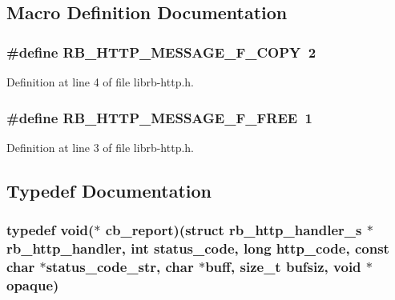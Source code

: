 \subsection{Macro Definition Documentation}
\hypertarget{librb-http_8h_a0ffdecd586e5dc8f1eeede6bac9bc19f}{
\subsubsection[{R\-B\-\_\-\-H\-T\-T\-P\-\_\-\-M\-E\-S\-S\-A\-G\-E\-\_\-\-F\-\_\-\-C\-O\-P\-Y}]{\setlength{\rightskip}{0pt plus 5cm}\#define R\-B\-\_\-\-H\-T\-T\-P\-\_\-\-M\-E\-S\-S\-A\-G\-E\-\_\-\-F\-\_\-\-C\-O\-P\-Y~2}}\label{librb-http_8h_a0ffdecd586e5dc8f1eeede6bac9bc19f}


Definition at line 4 of file librb-\/http.\-h.

\hypertarget{librb-http_8h_aef79f44f520e54cbedce1068fe324720}{
\subsubsection[{R\-B\-\_\-\-H\-T\-T\-P\-\_\-\-M\-E\-S\-S\-A\-G\-E\-\_\-\-F\-\_\-\-F\-R\-E\-E}]{\setlength{\rightskip}{0pt plus 5cm}\#define R\-B\-\_\-\-H\-T\-T\-P\-\_\-\-M\-E\-S\-S\-A\-G\-E\-\_\-\-F\-\_\-\-F\-R\-E\-E~1}}\label{librb-http_8h_aef79f44f520e54cbedce1068fe324720}


Definition at line 3 of file librb-\/http.\-h.



\subsection{Typedef Documentation}
\hypertarget{librb-http_8h_abcf27caf85ec3ac2b11d1b89aed63966}{
\subsubsection[{cb\-\_\-report}]{\setlength{\rightskip}{0pt plus 5cm}typedef void($\ast$ cb\-\_\-report)(struct {\bf rb\-\_\-http\-\_\-handler\-\_\-s} $\ast${\bf rb\-\_\-http\-\_\-handler}, int status\-\_\-code, long http\-\_\-code, const char $\ast$status\-\_\-code\-\_\-str, char $\ast$buff, size\-\_\-t bufsiz, void $\ast$opaque)}}\label{librb-http_8h_abcf27caf85ec3ac2b11d1b89aed63966}


